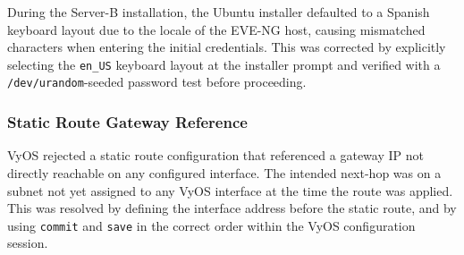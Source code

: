 During the Server-B installation, the Ubuntu installer defaulted to a Spanish
keyboard layout due to the locale of the EVE-NG host, causing mismatched characters
when entering the initial credentials. This was corrected by explicitly selecting the
\texttt{en\_US} keyboard layout at the installer prompt and verified with a
\texttt{/dev/urandom}-seeded password test before proceeding.

\subsubsection{Static Route Gateway Reference}

VyOS rejected a static route configuration that referenced a gateway IP not directly
reachable on any configured interface. The intended next-hop was on a subnet not yet
assigned to any VyOS interface at the time the route was applied. This was resolved
by defining the interface address before the static route, and by using
\texttt{commit} and \texttt{save} in the correct order within the VyOS configuration
session.

